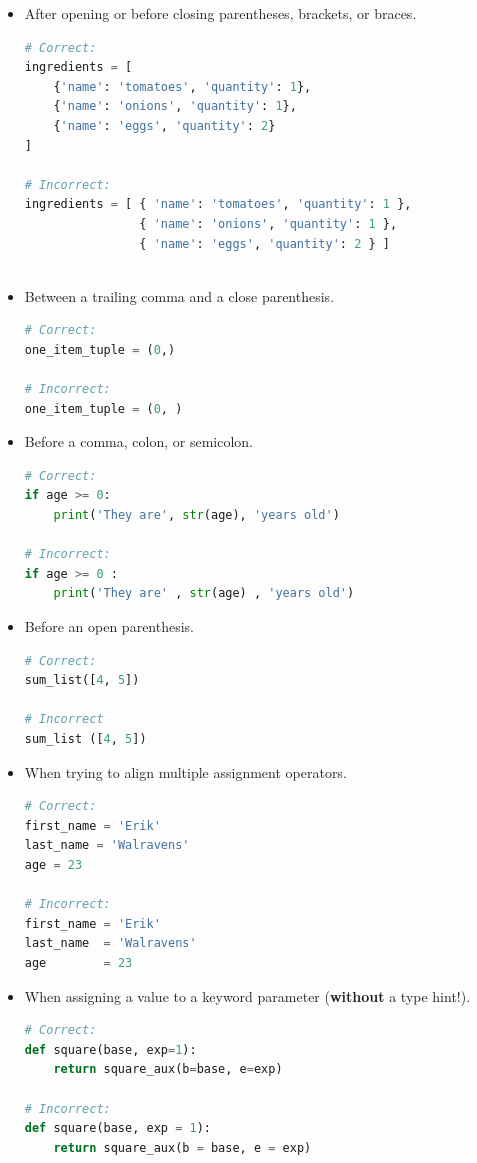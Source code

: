 \documentclass{tufte-handout}
\begin{document}
\begin{itemize}
	\item After opening or before closing parentheses, brackets, or braces.
	
\begin{lstlisting}[numbers=none,language=python]
# Correct:
ingredients = [
    {'name': 'tomatoes', 'quantity': 1},
    {'name': 'onions', 'quantity': 1},
    {'name': 'eggs', 'quantity': 2}
]
	
# Incorrect:
ingredients = [ { 'name': 'tomatoes', 'quantity': 1 },
                { 'name': 'onions', 'quantity': 1 },
                { 'name': 'eggs', 'quantity': 2 } ]
	
\end{lstlisting}
	
	\item Between a trailing comma and a close parenthesis.
	
\begin{lstlisting}[numbers=none,language=python]
# Correct:
one_item_tuple = (0,)

# Incorrect:
one_item_tuple = (0, )		
\end{lstlisting}

	\item Before a comma, colon, or semicolon.
	
\begin{lstlisting}[numbers=none,language=python]
# Correct:
if age >= 0: 
    print('They are', str(age), 'years old')
		
# Incorrect:
if age >= 0 : 
    print('They are' , str(age) , 'years old')	
\end{lstlisting}

	\item Before an open parenthesis.
	
\begin{lstlisting}[numbers=none,language=python]
# Correct:
sum_list([4, 5])

# Incorrect
sum_list ([4, 5])
\end{lstlisting}

	\item When trying to align multiple assignment operators.
	
\begin{lstlisting}[numbers=none,language=python]
# Correct:
first_name = 'Erik'
last_name = 'Walravens'
age = 23

# Incorrect:
first_name = 'Erik'
last_name  = 'Walravens'
age        = 23

\end{lstlisting}	

	\item When assigning a value to a keyword parameter (\textbf{without} a type hint!).
	
\begin{lstlisting}[numbers=none,language=python]
# Correct:
def square(base, exp=1):
    return square_aux(b=base, e=exp)
    
# Incorrect:
def square(base, exp = 1):
    return square_aux(b = base, e = exp)
\end{lstlisting}
	
\end{itemize}
\end{document}
